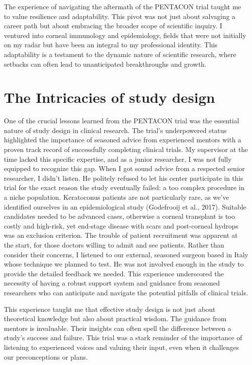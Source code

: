 \documentclass[authordate, reflection]{jote-new-article}
\begin{document}
	The experience of navigating the aftermath of the PENTACON trial taught me to value resilience and adaptability. This pivot was not just about salvaging a career path but about embracing the broader scope of scientific inquiry. I ventured into corneal immunology and epidemiology, fields that were not initially on my radar but have been an integral to my professional identity. This adaptability is a testament to the dynamic nature of scientific research, where setbacks can often lead to unanticipated breakthroughs and growth.



	\section{The Intricacies of study design}



	One of the crucial lessons learned from the PENTACON trial was the essential nature of study design in clinical research. The trial's underpowered status highlighted the importance of seasoned advice from experienced mentors with a proven track record of successfully completing clinical trials. My supervisor at the time lacked this specific expertise, and as a junior researcher, I was not fully equipped to recognize this gap. When I got sound advice from a respected senior researcher, I didn't listen. He politely refused to let his center participate in this trial for the exact reason the study eventually failed: a too complex procedure in a niche population. Keratoconus patients are not particularly rare, as we've identified ourselves in an epidemiological study (Godefrooij et al., 2017). Suitable candidates needed to be advanced cases, otherwise a corneal transplant is too costly and high-risk, yet end-stage disease with scars and post-corneal hydrops was an exclusion criterion. The trouble of patient recruitment was apparent at the start, for those doctors willing to admit and see patients. Rather than consider their concerns, I listened to our external, seasoned surgeon based in Italy whose technique we planned to test. He was not involved enough in the study to provide the detailed feedback we needed. This experience underscored the necessity of having a robust support system and guidance from seasoned researchers who can anticipate and navigate the potential pitfalls of clinical trials.



	This experience taught me that effective study design is not just about theoretical knowledge but also about practical wisdom. The guidance from mentors is invaluable. Their insights can often spell the difference between a study's success and failure. This trial was a stark reminder of the importance of listening to experienced voices and valuing their input, even when it challenges our preconceptions or plans.
\end{document}
